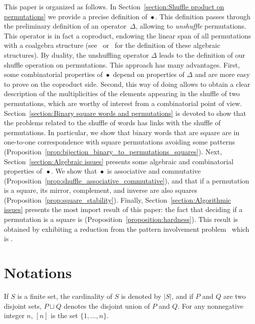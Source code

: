 \documentclass[a4paper]{llncs}
\DeclareMathOperator{\SHUFFLE}{\bullet}
\begin{document}
This paper is organized as follows. In
Section~\ref{section:Shuffle product on permutations} we provide a
precise definition of $\SHUFFLE$. This definition passes through the
preliminary definition of an operator~$\Delta$, allowing to
\emph{unshuffle} permutations. This operator is in fact a coproduct,
endowing the linear span of all permutations with a coalgebra structure
(see~\cite{Joni:Rota:1979} or~\cite{Grinberg:Reiner:2014} for the
definition of these algebraic structures). By duality, the unshuffling
operator $\Delta$ leads to the definition of our shuffle operation on
permutations. This approach has many advantages. First, some
combinatorial properties of $\SHUFFLE$ depend on properties of $\Delta$
and are more easy to prove on the coproduct side. Second, this way of
doing allows to obtain a clear description of the multiplicities of the
elements appearing in the shuffle of two permutations, which are worthy
of interest from a combinatorial point of view.
Section~\ref{section:Binary square words and permutations} is devoted to
show that the problems related to the shuffle of words has links with
the shuffle of permutations. In particular, we show that binary words
that are square are in one-to-one correspondence with square
permutations avoiding some patterns
(Proposition~\ref{prop:bijection_binary_to_permutations_squares}). Next,
Section~\ref{section:Algebraic issues} presents some algebraic and
combinatorial properties of~$\SHUFFLE$. We show that $\SHUFFLE$ is
associative and commutative
(Proposition~\ref{prop:shuffle_associative_commutative}), and that if a
permutation is a square, its mirror, complement, and inverse are also
squares (Proposition~\ref{prop:square_stability}). Finally,
Section~\ref{section:Algorithmic issues} presents the most import result
of this paper: the fact that deciding if a permutation is a square is
\NPC (Proposition~\ref{proposition:hardness}). This result is obtained
by exhibiting a reduction from the pattern involvement
problem~\cite{Bose:Buss:Lubiw:1998} which is \NPC.


\section{Notations}
\label{section:Notations}

If $S$ is a finite set, the cardinality of $S$ is denoted by $|S|$,
and if $P$ and $Q$ are two disjoint sets, $P \sqcup Q$ denotes the
disjoint union of $P$ and $Q$. For any nonnegative integer $n$, $[n]$
is the set $\{1, \dots, n\}$.
\end{document}
